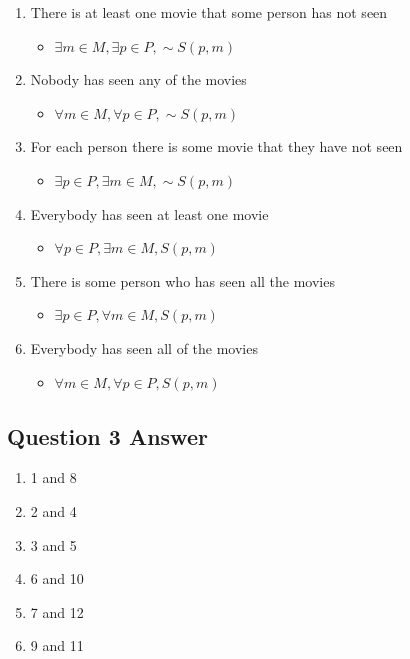 \documentclass[12pt,a4paper]{article}
\begin{document}
\begin{enumerate}
\begin{itemize}
	\end{itemize}
\item There is at least one movie that some person has not seen
	\begin{itemize}
	\item $\exists{m} \in{M}, \exists{p} \in{P}, \sim{S}(p, m)$ %
	\end{itemize}
\item Nobody has seen any of the movies
	\begin{itemize}
	\item $\forall{m} \in{M}, \forall{p} \in{P}, \sim{S}(p, m)$ %
	\end{itemize}
\item For each person there is some movie that they have not seen
	\begin{itemize}
	\item $\exists{p} \in{P}, \exists{m} \in{M}, \sim{S}(p, m)$ %
	\end{itemize}
\item Everybody has seen at least one movie
	\begin{itemize}
	\item $\forall{p} \in{P}, \exists{m} \in{M}, S(p, m)$ %
	\end{itemize}
\item There is some person who has seen all the movies
	\begin{itemize}
	\item $\exists{p} \in{P}, \forall{m} \in{M}, S(p, m)$ %
	\end{itemize}
\item Everybody has seen all of the movies
	\begin{itemize}
	\item $\forall{m} \in{M}, \forall{p} \in{P}, S(p, m)$ %
	\end{itemize}
\end{enumerate}

\subsection{Question 3 Answer}

\begin{enumerate}
\item 1 and 8
\item 2 and 4
\item 3 and 5
\item 6 and 10
\item 7 and 12
\item 9 and 11
\end{enumerate}
\end{document}
